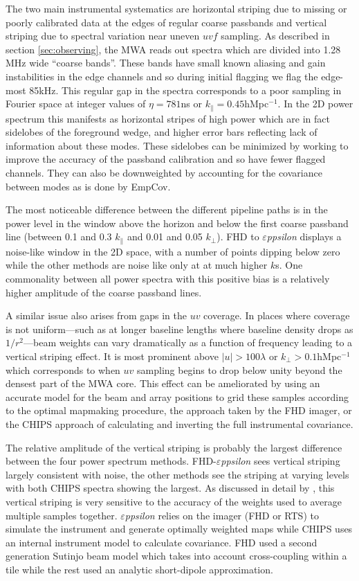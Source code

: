 \documentclass[twolcolumn,iop]{emulateapj}
\def\eppsilon{{\it $\varepsilon$ppsilon}}
\def\empirical{EmpCov}
\begin{document}
The two main instrumental systematics are horizontal striping due to missing or poorly calibrated data at the edges of regular coarse passbands and vertical striping due to spectral variation near uneven $uvf$ sampling. As described in section \ref{sec:observing}, the MWA reads out spectra which are divided into 1.28\,MHz wide ``coarse bands''. These bands have small known aliasing and gain instabilities in the edge channels and so during initial flagging we flag the edge-most 85kHz.  This regular gap in the spectra corresponds to a poor sampling in Fourier space at integer values of $\eta=781$ns or $k_\parallel=0.45$hMpc$^{-1}$.  In the 2D power spectrum this manifests as horizontal stripes of high power which are in fact sidelobes of the foreground wedge, and higher error bars reflecting lack of information about these modes.  These sidelobes can be minimized by working to improve the accuracy of the passband calibration and so have fewer flagged channels. They can also be downweighted by accounting for the covariance between modes as is done by \empirical{}. 

The most noticeable difference between the different pipeline paths is in the power level in the window above the horizon and below the first coarse passband line (between 0.1 and 0.3 $k_\parallel$ and 0.01 and 0.05 $k_\perp$). FHD to \eppsilon{} displays a noise-like window in the 2D space, with a number of points dipping below zero while the other methods are noise like only at at much higher $k$s.  One commonality between all power spectra with this positive bias is a relatively higher amplitude of the coarse passband lines. 


 A similar issue also arises from gaps in the $uv$ coverage. In places where coverage is not uniform---such as at longer baseline lengths where baseline density drops as $1/r^2$---beam weights can vary dramatically as a function of frequency leading to a vertical striping effect. It is most prominent above $|u|>100\lambda$ or $k_\perp>0.1$hMpc$^{-1}$ which corresponds to when $uv$ sampling begins to drop below unity beyond the densest part of the MWA core. This effect can be ameliorated by using an accurate model for the beam and array positions to grid these samples according to the optimal mapmaking procedure, the approach taken by the FHD imager, or the CHIPS approach of calculating and inverting the full instrumental covariance. 
 
The relative amplitude of the vertical striping is probably the largest difference between the four power spectrum methods.   FHD-\eppsilon{} sees vertical striping largely consistent with noise, the other methods see the striping at varying levels with both CHIPS spectra showing the largest.  As discussed in detail by \cite{Morales:2012p8790}, this vertical striping is very sensitive to the accuracy of the weights used to average multiple samples together.  \eppsilon{} relies on the imager (FHD or RTS) to simulate the instrument and generate optimally weighted maps while CHIPS uses an internal instrument model to calculate covariance. FHD used a second generation Sutinjo beam model which takes into account cross-coupling within a tile while the rest used an analytic short-dipole approximation.
\end{document}
